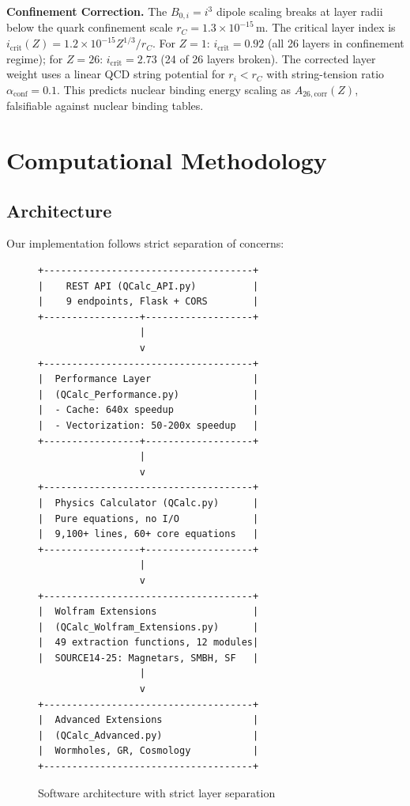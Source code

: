 \documentclass[12pt,a4paper]{article}
\begin{document}
\textbf{Confinement Correction.} The $B_{0,i} = i^3$ dipole scaling breaks at layer radii below the quark confinement scale $r_C = 1.3 \times 10^{-15}$\,m. The critical layer index is $i_{\mathrm{crit}}(Z) = 1.2 \times 10^{-15} Z^{1/3} / r_C$. For $Z=1$: $i_{\mathrm{crit}} = 0.92$ (all 26 layers in confinement regime); for $Z=26$: $i_{\mathrm{crit}} = 2.73$ (24 of 26 layers broken). The corrected layer weight uses a linear QCD string potential for $r_i < r_C$ with string-tension ratio $\alpha_{\mathrm{conf}} = 0.1$. This predicts nuclear binding energy scaling as $A_{26,\mathrm{corr}}(Z)$, falsifiable against nuclear binding tables.

\section{Computational Methodology}

\subsection{Architecture}

Our implementation follows strict separation of concerns:

\begin{figure}[H]
\centering
\begin{verbatim}
+-------------------------------------+
|    REST API (QCalc_API.py)          |
|    9 endpoints, Flask + CORS        |
+-----------------+-------------------+
                  |
                  v
+-------------------------------------+
|  Performance Layer                  |
|  (QCalc_Performance.py)             |
|  - Cache: 640x speedup              |
|  - Vectorization: 50-200x speedup   |
+-----------------+-------------------+
                  |
                  v
+-------------------------------------+
|  Physics Calculator (QCalc.py)      |
|  Pure equations, no I/O             |
|  9,100+ lines, 60+ core equations   |
+-----------------+-------------------+
                  |
                  v
+-------------------------------------+
|  Wolfram Extensions                 |
|  (QCalc_Wolfram_Extensions.py)      |
|  49 extraction functions, 12 modules|
|  SOURCE14-25: Magnetars, SMBH, SF   |
                  |
                  v
+-------------------------------------+
|  Advanced Extensions                |
|  (QCalc_Advanced.py)                |
|  Wormholes, GR, Cosmology           |
+-------------------------------------+
\end{verbatim}
\caption{Software architecture with strict layer separation}
\label{fig:architecture}
\end{figure}
\end{document}
